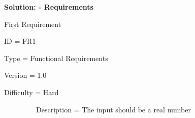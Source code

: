 \documentclass[12pt]{article}
\begin{document}
\vspace{\baselineskip}\begin{justify}
\textbf{Solution: - Requirements}
\end{justify}\par




\begin{adjustwidth}{0.25in}{0.0in}
\begin{justify}
 First Requirement
\end{justify}\par

\end{adjustwidth}



\begin{adjustwidth}{0.49in}{0.0in}
\begin{justify}
ID = FR1
\end{justify}\par

\end{adjustwidth}



\begin{adjustwidth}{0.49in}{0.0in}
\begin{justify}
Type = Functional Requirements
\end{justify}\par

\end{adjustwidth}



\begin{adjustwidth}{0.49in}{0.0in}
\begin{justify}
Version = 1.0
\end{justify}\par

\end{adjustwidth}



\begin{adjustwidth}{0.49in}{0.0in}
\begin{justify}
Difficulty = Hard
\end{justify}\par

\end{adjustwidth}



\ \ \ \ \ \ \ \ \ Description = The input should be a real number\par
\end{document}
